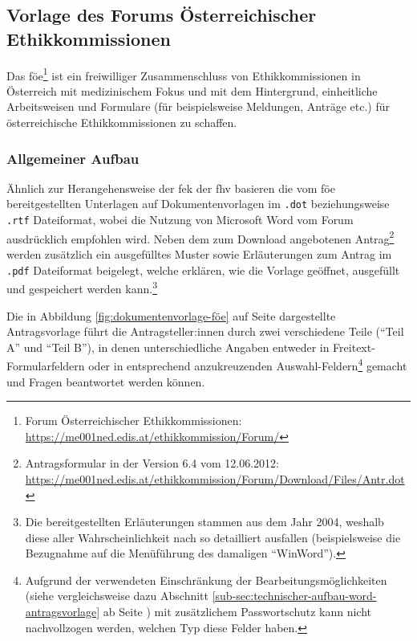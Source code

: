 \documentclass[a4paper,12pt,twoside]{scrreprt}
\begin{document}
\subsection{Vorlage des Forums Österreichischer Ethikkommissionen}
\label{sub-sec:vorlage-föe}

Das \ac{föe}\footnote{Forum Österreichischer Ethikkommissionen: \url{https://me001ned.edis.at/ethikkommission/Forum/}} ist ein freiwilliger Zusammenschluss von Ethikkommissionen in Österreich mit medizinischem Fokus und mit dem Hintergrund, einheitliche Arbeitsweisen und Formulare (für beispielsweise Meldungen, Anträge etc.) für österreichische Ethikkommissionen zu schaffen. \cite{ethikkommission_der_medizinischen_universitat_graz_forum_2019}

\subsubsection*{Allgemeiner Aufbau}
\label{sub-sub-sec:föe-allgemeiner-aufbau}

Ähnlich zur Herangehensweise der \acl{fek} der \acl{fhv} basieren die vom \ac{föe} bereitgestellten Unterlagen auf Dokumentenvorlagen im \texttt{.dot} beziehungsweise \texttt{.rtf} Dateiformat, wobei die Nutzung von Microsoft Word vom Forum ausdrücklich empfohlen wird. Neben dem zum Download angebotenen Antrag\footnote{Antragsformular in der Version 6.4 vom 12.06.2012: \url{https://me001ned.edis.at/ethikkommission/Forum/Download/Files/Antr.dot}} werden zusätzlich ein ausgefülltes Muster sowie Erläuterungen zum Antrag im \texttt{.pdf} Dateiformat beigelegt, welche erklären, wie die Vorlage geöffnet, ausgefüllt und gespeichert werden kann.\footnote{Die bereitgestellten Erläuterungen stammen aus dem Jahr 2004, weshalb diese aller Wahrscheinlichkeit nach so detailliert ausfallen (beispielsweise die Bezugnahme auf die Menüführung des damaligen \enquote{WinWord}).} \cite{ethikkommission_der_medizinischen_universitat_graz_download_2012}

\medskip

Die in Abbildung \ref{fig:dokumentenvorlage-föe} auf Seite \pageref{fig:dokumentenvorlage-föe} dargestellte Antragsvorlage führt die Antragsteller:innen durch zwei verschiedene Teile (\enquote{Teil A} und \enquote{Teil B}), in denen unterschiedliche Angaben entweder in Freitext-Formularfeldern oder in entsprechend anzukreuzenden Auswahl-Feldern\footnote{Aufgrund der verwendeten Einschränkung der Bearbeitungsmöglichkeiten (siehe vergleichsweise dazu Abschnitt \ref{sub-sec:technischer-aufbau-word-antragsvorlage} ab Seite \pageref{sub-sec:technischer-aufbau-word-antragsvorlage}) mit zusätzlichem Passwortschutz kann nicht nachvollzogen werden, welchen Typ diese Felder haben.} gemacht und Fragen beantwortet werden können.
\end{document}
